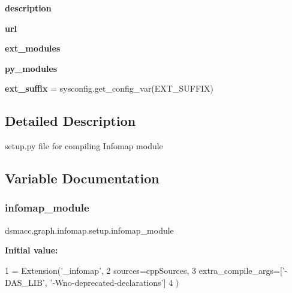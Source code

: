 \begin{DoxyCompactItemize}
{\bfseries description}
\item 
\mbox{\label{namespacedsmacc_1_1graph_1_1infomap_1_1setup_abb2dd668d7db96ccb88d9fe2a8555038}} 
{\bfseries url}
\item 
\mbox{\label{namespacedsmacc_1_1graph_1_1infomap_1_1setup_a1d0f07a9d9755709d20d78bffdc089df}} 
{\bfseries ext\+\_\+modules}
\item 
\mbox{\label{namespacedsmacc_1_1graph_1_1infomap_1_1setup_acb8f50537242adab3266753f6313bfbc}} 
{\bfseries py\+\_\+modules}
\item 
\mbox{\label{namespacedsmacc_1_1graph_1_1infomap_1_1setup_a79a54639d4ceb4f2af9d30b609318f4e}} 
{\bfseries ext\+\_\+suffix} = sysconfig.\+get\+\_\+config\+\_\+var(\textquotesingle{}E\+X\+T\+\_\+\+S\+U\+F\+F\+IX\textquotesingle{})
\end{DoxyCompactItemize}


\subsection{Detailed Description}
\begin{DoxyVerb}setup.py file for compiling Infomap module
\end{DoxyVerb}
 

\subsection{Variable Documentation}
\mbox{\label{namespacedsmacc_1_1graph_1_1infomap_1_1setup_abed72903bf899931866430b9dd31cecf}} 
\subsubsection{\texorpdfstring{infomap\+\_\+module}{infomap\_module}}
{\footnotesize\ttfamily dsmacc.\+graph.\+infomap.\+setup.\+infomap\+\_\+module}

{\bfseries Initial value\+:}
\begin{DoxyCode}
1 =  Extension(\textcolor{stringliteral}{'\_infomap'},
2     sources=cppSources,
3     extra\_compile\_args=[\textcolor{stringliteral}{'-DAS\_LIB'}, \textcolor{stringliteral}{'-Wno-deprecated-declarations'}]
4     )
\end{DoxyCode}
